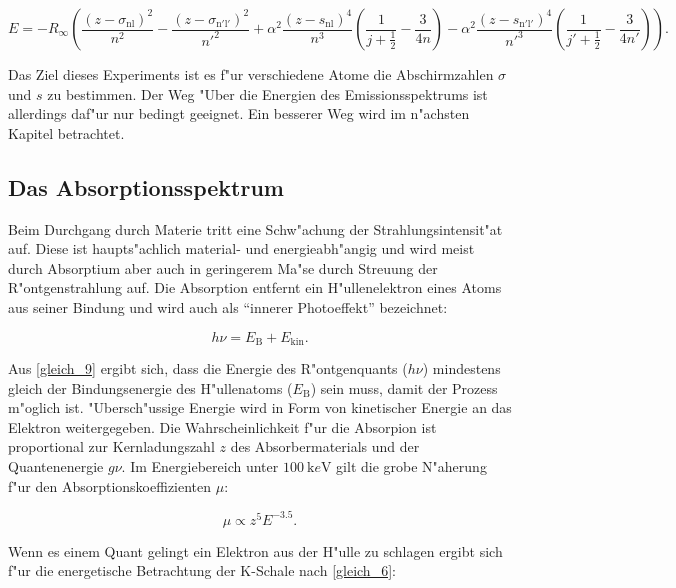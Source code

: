 		\begin{equation}
			E = -R_\infty \left( \frac{(z - \sigma_\mathrm{nl})^2}{n^2} - \frac{(z - \sigma_\mathrm{n'l'})^2}{n'^2} +  \alpha^2 \frac{(z - s_\mathrm{nl})^4}{n^3} \left( \frac{1}{j + \frac{1}{2}} - \frac{3}{4n} \right) - \alpha^2 \frac{(z - s_\mathrm{n'l'})^4}{n'^3} \left( \frac{1}{j' + \frac{1}{2}} - \frac{3}{4n'} \right) \right) . \label{gleich_8}
		\end{equation}

		Das Ziel dieses Experiments ist es f"ur verschiedene Atome die Abschirmzahlen $\sigma$ und $s$ zu bestimmen.
		Der Weg "Uber die Energien des Emissionsspektrums ist allerdings daf"ur nur bedingt geeignet.
		Ein besserer Weg wird im n"achsten Kapitel betrachtet.

	\subsection{Das Absorptionsspektrum}
	\label{sub:das_absorptionsspektrum}
	
		Beim Durchgang durch Materie tritt eine Schw"achung der Strahlungsintensit"at auf.
		Diese ist haupts"achlich material- und energieabh"angig und wird meist durch Absorptium aber auch in geringerem Ma"se durch Streuung der R"ontgenstrahlung auf. 
		Die Absorption entfernt ein H"ullenelektron eines Atoms aus seiner Bindung und wird auch als "`innerer Photoeffekt"' bezeichnet:

		\begin{equation}
			h\nu = E_\mathrm{B} + E_\mathrm{kin}. \label{gleich_9}
		\end{equation}

		Aus \ref{gleich_9} ergibt sich, dass die Energie des R"ontgenquants ($h\nu$) mindestens gleich der Bin\-dungs\-en\-er\-gie des H"ullenatoms ($E_\mathrm{B}$) sein muss, damit der Prozess m"oglich ist.
		"Ubersch"ussige Energie wird in Form von kinetischer Energie an das Elektron weitergegeben.
		Die Wahr\-schein\-lich\-keit f"ur die Absorpion ist proportional zur Kernladungszahl $z$ des Absorbermaterials und der Quantenenergie $g\nu$.
		Im Energiebereich unter $\SI{100}{\kilo e \volt}$ gilt die grobe N"aherung f"ur den Absorptionskoeffizienten $\mu$:
		
		\begin{equation}
			\mu \propto z^5 E^{-3.5}. \label{gleich_10}
		\end{equation}

		Wenn es einem Quant gelingt ein Elektron aus der H"ulle zu schlagen ergibt sich f"ur die energetische Betrachtung der K-Schale nach \ref{gleich_6}:

